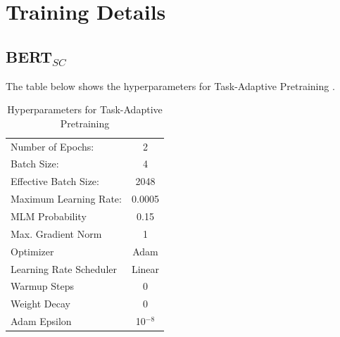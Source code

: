 \documentclass{report}
\theoremstyle{definition}
\theoremstyle{remark}
\begin{document}
\chapter{Training Details}
\section{BERT$_{SC}$}
\label{sec:app:bertsc}
The table below shows the hyperparameters for Task-Adaptive Pretraining \cite{DontStop}.
\begin{table}[h!]
    \centering
    \begin{tabular}{|lc|}
    \hline
     Number of Epochs: & 2  \\
     Batch Size: & 4\\
     Effective Batch Size: & 2048 \\
     Maximum Learning Rate: & 0.0005 \\
     MLM Probability & 0.15 \\
     Max. Gradient Norm & 1 \\
     Optimizer & Adam \cite{adamopt} \\
     Learning Rate Scheduler & Linear \\
     Warmup Steps & 0 \\
     Weight Decay & 0 \\
     Adam Epsilon & 10$^{-8}$ \\
     \hline
    \end{tabular}
    \caption{Hyperparameters for Task-Adaptive Pretraining}
    \label{tab:pretrainhyper}
\end{table}
\newpage
\end{document}

